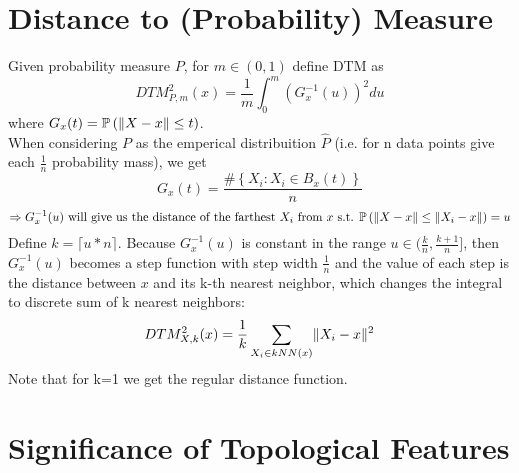 \documentclass[11pt]{article}
\theoremstyle{definition}
\theoremstyle{definition}
\begin{document}

\section{Distance to (Probability) Measure}
Given probability measure $P$, for $m \in (0,1)$ define DTM as
$$DTM^2_{P,m}(x) = \frac{1}{m} \int_{0}^{m} \left( G_x^{-1}(u)\right)^2 du$$
where $G_x(t) = \mathbb{P} \left( \mathopen\| X - x \mathclose\| \leq t \right)$.\\
When considering $P$ as the emperical distribuition $\hat P$ (i.e. for n data points give each $\frac{1}{n}$ probability mass), we get
$$G_x(t) = \frac{\# \left\{X_i: X_i \in B_x(t) \right\}}{n}$$
$$\Rightarrow G_x^{-1}(u) \text{ will give us the distance of the farthest $X_i$ from $x$ s.t. } \mathbb{P} \left( \mathopen\| X-x \mathclose\| \leq \mathopen\| X_i - x \mathclose\| \right) = u$$
Define $k=\lceil u * n \rceil$. Because $G_x^{-1} (u)$ is constant in the range $u \in (\frac{k}{n}, \frac{k+1}{n}]$, then $G_x^{-1}(u)$ becomes a step function with step width $\frac{1}{n}$ and the value of each step is the distance between $x$ and its k-th nearest neighbor, which changes the integral to discrete sum of k nearest neighbors:
$$DTM^2_{X,k} (x) =\frac{1}{k} \sum_{X_i \in kNN(x)} \mathopen\| X_i - x \mathclose\|^2$$
Note that for k=1 we get the regular distance function.


\section{Significance of Topological Features}
\end{document}
